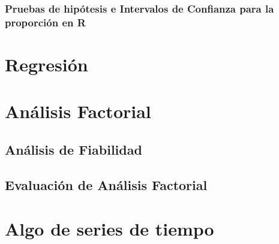 \documentclass[]{book}
\begin{document}
\subsection{Pruebas de hipótesis e Intervalos de Confianza para la
proporción en
R}\label{pruebas-de-hipotesis-e-intervalos-de-confianza-para-la-proporcion-en-r}

\chapter{Regresión}\label{methods}

\chapter{Análisis Factorial}\label{analisis-factorial}

\section{Análisis de Fiabilidad}\label{analisis-de-fiabilidad}

\section{Evaluación de Análisis
Factorial}\label{evaluacion-de-analisis-factorial}

\chapter{Algo de series de tiempo}\label{algo-de-series-de-tiempo}


\end{document}
